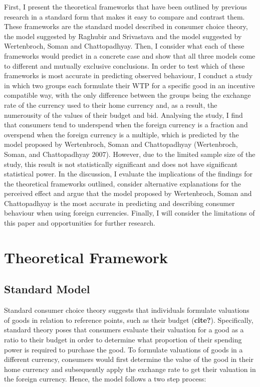 \documentclass[
]{report}
\begin{document}
First, I present the theoretical frameworks that have been outlined by
previous research in a standard form that makes it easy to compare and
contrast them. These frameworks are the standard model described in
consumer choice theory, the model suggested by Raghubir and Srivastava
and the model suggested by Wertenbroch, Soman and Chattopadhyay. Then, I
consider what each of these frameworks would predict in a concrete case
and show that all three models come to different and mutually exclusive
conclusions. In order to test which of these frameworks is most accurate
in predicting observed behaviour, I conduct a study in which two groups
each formulate their WTP for a specific good in an incentive compatible
way, with the only difference between the groups being the exchange rate
of the currency used to their home currency and, as a result, the
numerousity of the values of their budget and bid. Analysing the study,
I find that consumers tend to underspend when the foreign currency is a
fraction and overspend when the foreign currency is a multiple, which is
predicted by the model proposed by Wertenbroch, Soman and Chattopadhyay
(Wertenbroch, Soman, and Chattopadhyay 2007). However, due to the
limited sample size of the study, this result is not statistically
significant and does not have significant statistical power. In the
discussion, I evaluate the implications of the findings for the
theoretical frameworks outlined, consider alternative explanations for
the perceived effect and argue that the model proposed by Wertenbroch,
Soman and Chattopadhyay is the most accurate in predicting and
describing consumer behaviour when using foreign currencies. Finally, I
will consider the limitations of this paper and opportunities for
further research.

\chapter{Theoretical Framework}\label{theoretical-framework}

\section{Standard Model}\label{standard-model}

Standard consumer choice theory suggests that individuals formulate
valuations of goods in relation to reference points, such as their
budget (\textbf{cite?}). Specifically, standard theory poses that
consumers evaluate their valuation for a good as a ratio to their budget
in order to determine what proportion of their spending power is
required to purchase the good. To formulate valuations of goods in a
different currency, consumers would first determine the value of the
good in their home currency and subsequently apply the exchange rate to
get their valuation in the foreign currency. Hence, the model follows a
two step process:
\end{document}
